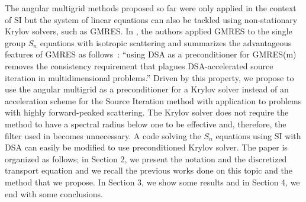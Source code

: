 The angular multigrid methods proposed so far were only applied in the context
of SI but the system of linear equations can also be tackled using non-stationary 
Krylov solvers, such as GMRES. In \cite{ttg}, the authors applied GMRES to
the single group $S_n$ equations with isotropic scattering and 
summarizes the advantageous features of GMRES as \hbox{follows :} ``using DSA as a 
preconditioner for GMRES(m) removes the consistency requirement that plagues 
DSA-accelerated source iteration in multidimensional problems.'' Driven by this
property, we propose to use the angular multigrid as a preconditioner for a 
Krylov solver instead of an acceleration scheme for the Source Iteration
method with application to problems with highly forward-peaked scattering. 
The Krylov solver does not require the method to have a spectral
radius below one to be effective and, therefore, the filter used in
\cite{multigrid_2d} becomes
unnecessary. A code solving the $S_n$ equations using SI with DSA can easily
be modified to use preconditioned Krylov solver. The paper is organized as 
follows; in Section 2, we present the
notation and the discretized transport equation and we recall the
previous works done on this topic and the method that we propose. In Section
3, we show some results and in Section 4, we end with some conclusions.

